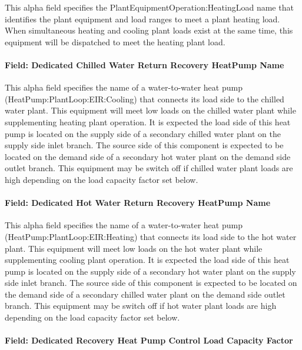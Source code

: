 This alpha field specifies the PlantEquipmentOperation:HeatingLoad name that identifies the plant equipment and load ranges to meet a plant heating load. When simultaneous heating and cooling plant loads exist at the same time, this equipment will be dispatched to meet the heating plant load.

\paragraph{Field: Dedicated Chilled Water Return Recovery HeatPump Name}\label{field-dedicated-chilled-return-recovery-hp-name-plantequipmentoperationchillerheaterchangeover}

This alpha field specifies the name of a water-to-water heat pump (HeatPump:PlantLoop:EIR:Cooling) that connects its load side to the chilled water plant. This equipment will meet low loads on the chilled water plant while supplementing heating plant operation. It is expected the load side of this heat pump is located on the supply side of a secondary chilled water plant on the supply side inlet branch. The source side of this component is expected to be located on the demand side of a secondary hot water plant on the demand side outlet branch. This equipment may be switch off if chilled water plant loads are high depending on the load capacity factor set below.

\paragraph{Field: Dedicated Hot Water Return Recovery HeatPump Name}\label{field-dedicated-hot-return-recovery-hp-name-plantequipmentoperationchillerheaterchangeover}

This alpha field specifies the name of a water-to-water heat pump (HeatPump:PlantLoop:EIR:Heating) that connects its load side to the hot water plant. This equipment will meet low loads on the hot water plant while supplementing cooling plant operation. It is expected the load side of this heat pump is located on the supply side of a secondary hot water plant on the supply side inlet branch. The source side of this component is expected to be located on the demand side of a secondary chilled water plant on the demand side outlet branch. This equipment may be switch off if hot water plant loads are high depending on the load capacity factor set below.

\paragraph{Field: Dedicated Recovery Heat Pump Control Load Capacity Factor}\label{field-dedicated-recovery-heat-pump-control-load-capacity-factor}


